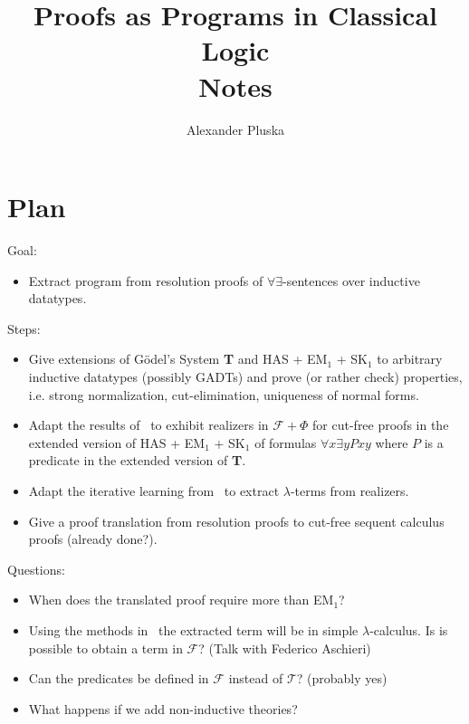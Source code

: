 \documentclass[onehalfspacing]{article}
\author{Alexander Pluska}
\title{Proofs as Programs in Classical Logic\\Notes}
\theoremstyle{definition}
\theoremstyle{definition}
\theoremstyle{definition}
\theoremstyle{definition}
\theoremstyle{definition}
\theoremstyle{definition}
\begin{document}
\maketitle

\section{Plan}

Goal:
\begin{itemize}
	\item Extract program from resolution proofs of $\forall\exists$-sentences over inductive datatypes.
\end{itemize}

\noindent Steps:

\begin{itemize}
	\item Give extensions of G\"odel's System \textbf{T} and HAS + EM$_1$ + SK$_1$ to arbitrary inductive datatypes (possibly GADTs) and prove (or rather check) properties, i.e. strong normalization, cut-elimination, uniqueness of normal forms.
	\item Adapt the results of~\cite{aschieri2014interactive} to exhibit realizers in $\mathcal{F} + \Phi$ for cut-free proofs in the extended version of HAS + EM$_1$ + SK$_1$ of formulas $\forall x\exists y Pxy$ where $P$ is a predicate in the extended version of \textbf{T}.
	\item Adapt the iterative learning from~\cite{aschieri2014interactive} to extract $\lambda$-terms from realizers.
	\item Give a proof translation from resolution proofs to cut-free sequent calculus proofs (already done?).
\end{itemize}

\noindent Questions:
\begin{itemize}
	\item When does the translated proof require more than EM$_1$?
	\item Using the methods in~\cite{aschieri2014interactive} the extracted term will be in simple $\lambda$-calculus. Is is possible to obtain a term in $\mathcal{F}$? (Talk with Federico Aschieri)
	\item Can the predicates be defined in $\mathcal{F}$ instead of $\mathcal{T}$? (probably yes)
	\item What happens if we add non-inductive theories?
	
\end{itemize}
\end{document}
